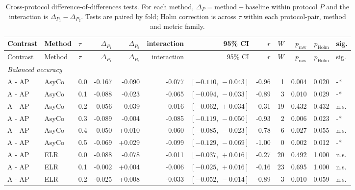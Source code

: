 
\begin{landscape}
\begin{scriptsize}
\setlength{\tabcolsep}{2.5pt}
\setlength{\LTcapwidth}{\linewidth}
\begin{longtable}{lllrrrrrrrrl}
\caption{Cross-protocol difference-of-differences tests. For each method, $\Delta_P=\text{method}-\text{baseline}$ within protocol $P$ and the interaction is $\Delta_{P_1}-\Delta_{P_2}$. Tests are paired by fold; Holm correction is across $\tau$ within each protocol-pair, method and metric family.}\label{tab:app-interaction-full}\\
\toprule
Contrast & Method & $\tau$ & $\Delta_{P_1}$ & $\Delta_{P_2}$ & interaction & 95\% CI & $r$ & $W$ & $p_{\mathrm{raw}}$ & $p_{\mathrm{Holm}}$ & sig. \\
\midrule
\endfirsthead
\toprule
Contrast & Method & $\tau$ & $\Delta_{P_1}$ & $\Delta_{P_2}$ & interaction & 95\% CI & $r$ & $W$ & $p_{\mathrm{raw}}$ & $p_{\mathrm{Holm}}$ & sig. \\
\midrule
\endhead
\multicolumn{12}{l}{\textit{Balanced accuracy}} \\
A - AP & AsyCo & 0.0 & -0.167 & -0.090 & -0.077 & $[-0.110,\,-0.043]$ & -0.96 & 1 & 0.004 & 0.020 & -* \\
A - AP & AsyCo & 0.1 & -0.088 & -0.023 & -0.065 & $[-0.094,\,-0.033]$ & -0.89 & 3 & 0.010 & 0.029 & -* \\
A - AP & AsyCo & 0.2 & -0.056 & -0.039 & -0.016 & $[-0.062,\,+0.034]$ & -0.31 & 19 & 0.432 & 0.432 & n.s. \\
A - AP & AsyCo & 0.3 & -0.089 & -0.004 & -0.085 & $[-0.119,\,-0.050]$ & -0.93 & 2 & 0.006 & 0.023 & -* \\
A - AP & AsyCo & 0.4 & -0.050 & +0.010 & -0.060 & $[-0.085,\,-0.023]$ & -0.78 & 6 & 0.027 & 0.055 & n.s. \\
A - AP & AsyCo & 0.5 & -0.069 & +0.029 & -0.099 & $[-0.129,\,-0.069]$ & -1.00 & 0 & 0.002 & 0.012 & -* \\
A - AP & ELR & 0.0 & -0.088 & -0.078 & -0.011 & $[-0.037,\,+0.016]$ & -0.27 & 20 & 0.492 & 1.000 & n.s. \\
A - AP & ELR & 0.1 & -0.002 & +0.004 & -0.006 & $[-0.025,\,+0.016]$ & -0.16 & 23 & 0.695 & 1.000 & n.s. \\
A - AP & ELR & 0.2 & -0.025 & +0.008 & -0.033 & $[-0.052,\,-0.014]$ & -0.89 & 3 & 0.010 & 0.059 & n.s. \\

\end{longtable}
\end{scriptsize}
\end{landscape}
